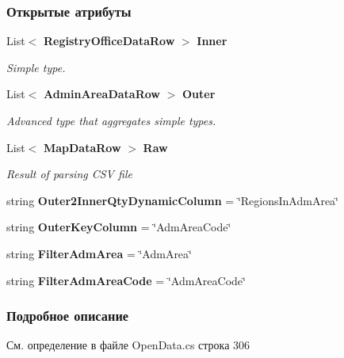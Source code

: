 \subsubsection*{Открытые атрибуты}
\begin{DoxyCompactItemize}
\item 
List$<$ {\bf Registry\+Office\+Data\+Row} $>$ {\bf Inner}
\begin{DoxyCompactList}\small\item\em Simple type. \end{DoxyCompactList}\item 
List$<$ {\bf Admin\+Area\+Data\+Row} $>$ {\bf Outer}
\begin{DoxyCompactList}\small\item\em Advanced type that aggregates simple types. \end{DoxyCompactList}\item 
List$<$ {\bf Map\+Data\+Row} $>$ {\bf Raw}
\begin{DoxyCompactList}\small\item\em Result of parsing C\+S\+V file \end{DoxyCompactList}\item 
string {\bfseries Outer2\+Inner\+Qty\+Dynamic\+Column} = \char`\"{}Regions\+In\+Adm\+Area\char`\"{}\label{classkdz__manager_1_1_open_data_a93728bb726e51b49493c8628f2037c94}

\item 
string {\bfseries Outer\+Key\+Column} = \char`\"{}Adm\+Area\+Code\char`\"{}\label{classkdz__manager_1_1_open_data_a8190edc858cdfea68fb72782608ea6f8}

\item 
string {\bfseries Filter\+Adm\+Area} = \char`\"{}Adm\+Area\char`\"{}\label{classkdz__manager_1_1_open_data_a5fc102f36a819b3bc81627a8d931ab3e}

\item 
string {\bfseries Filter\+Adm\+Area\+Code} = \char`\"{}Adm\+Area\+Code\char`\"{}\label{classkdz__manager_1_1_open_data_afd6b740ac445668267e4f69729b7d391}

\end{DoxyCompactItemize}


\subsubsection{Подробное описание}


См. определение в файле Open\+Data.\+cs строка 306



